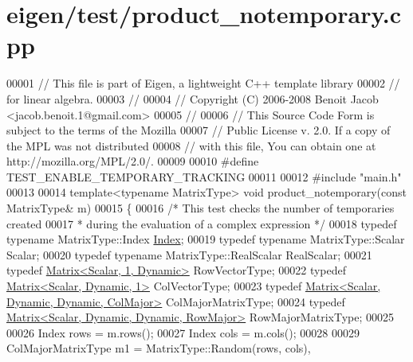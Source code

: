 \hypertarget{eigen_2test_2product__notemporary_8cpp_source}{}\section{eigen/test/product\+\_\+notemporary.cpp}
\label{eigen_2test_2product__notemporary_8cpp_source}

\begin{DoxyCode}
00001 \textcolor{comment}{// This file is part of Eigen, a lightweight C++ template library}
00002 \textcolor{comment}{// for linear algebra.}
00003 \textcolor{comment}{//}
00004 \textcolor{comment}{// Copyright (C) 2006-2008 Benoit Jacob <jacob.benoit.1@gmail.com>}
00005 \textcolor{comment}{//}
00006 \textcolor{comment}{// This Source Code Form is subject to the terms of the Mozilla}
00007 \textcolor{comment}{// Public License v. 2.0. If a copy of the MPL was not distributed}
00008 \textcolor{comment}{// with this file, You can obtain one at http://mozilla.org/MPL/2.0/.}
00009 
00010 \textcolor{preprocessor}{#define TEST\_ENABLE\_TEMPORARY\_TRACKING}
00011 
00012 \textcolor{preprocessor}{#include "main.h"}
00013 
00014 \textcolor{keyword}{template}<\textcolor{keyword}{typename} MatrixType> \textcolor{keywordtype}{void} product\_notemporary(\textcolor{keyword}{const} MatrixType& m)
00015 \{
00016   \textcolor{comment}{/* This test checks the number of temporaries created}
00017 \textcolor{comment}{   * during the evaluation of a complex expression */}
00018   \textcolor{keyword}{typedef} \textcolor{keyword}{typename} MatrixType::Index \hyperlink{namespace_eigen_a62e77e0933482dafde8fe197d9a2cfde}{Index};
00019   \textcolor{keyword}{typedef} \textcolor{keyword}{typename} MatrixType::Scalar Scalar;
00020   \textcolor{keyword}{typedef} \textcolor{keyword}{typename} MatrixType::RealScalar RealScalar;
00021   \textcolor{keyword}{typedef} \hyperlink{group___core___module_class_eigen_1_1_matrix}{Matrix<Scalar, 1, Dynamic>} RowVectorType;
00022   \textcolor{keyword}{typedef} \hyperlink{group___core___module}{Matrix<Scalar, Dynamic, 1>} ColVectorType;
00023   \textcolor{keyword}{typedef} \hyperlink{group___core___module_class_eigen_1_1_matrix}{Matrix<Scalar, Dynamic, Dynamic, ColMajor>} 
      ColMajorMatrixType;
00024   \textcolor{keyword}{typedef} \hyperlink{group___core___module_class_eigen_1_1_matrix}{Matrix<Scalar, Dynamic, Dynamic, RowMajor>} 
      RowMajorMatrixType;
00025 
00026   Index rows = m.rows();
00027   Index cols = m.cols();
00028 
00029   ColMajorMatrixType m1 = MatrixType::Random(rows, cols),

\end{DoxyCode}
